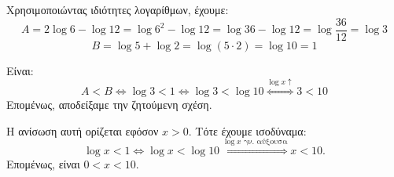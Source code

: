\begin{alist}
\item Χρησιμοποιώντας ιδιότητες λογαρίθμων, έχουμε:
\[A = 2\log 6 - \log 12 = \log 6^2 - \log 12 = \log 36 - \log 12 = \log\frac{36}{12} = \log 3\]
\[B = \log 5 + \log 2 = \log(5\cdot 2) = \log 10 = 1\]
\item Είναι:
\[A < B \Leftrightarrow \log 3 < 1 \Leftrightarrow \log 3 < \log 10 \overset{\log x \uparrow}{\Longleftrightarrow} 3 < 10\]
Επομένως, αποδείξαμε την ζητούμενη σχέση.
\item Η ανίσωση αυτή ορίζεται εφόσον $x > 0$. Τότε έχουμε ισοδύναμα:
\[\log x < 1 \Leftrightarrow \log x < \log 10 \overset{\log x \text{ γν.\ αύξουσα}}{\Longleftrightarrow} x < 10.\]
Επομένως, είναι $0 < x < 10$.
\end{alist}

